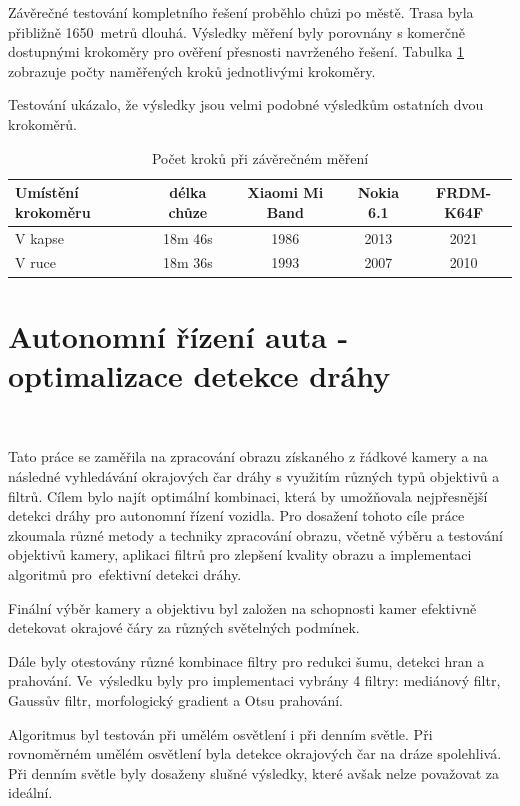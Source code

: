 Závěrečné testování kompletního řešení proběhlo chůzi po městě. Trasa byla přibližně 1650~metrů dlouhá. Výsledky měření byly porovnány s komerčně dostupnými krokoměry pro ověření přesnosti navrženého řešení. Tabulka \ref{tab:2}  zobrazuje počty naměřených kroků jednotlivými krokoměry.

Testování ukázalo, že výsledky jsou velmi podobné výsledkům ostatních dvou krokoměrů\cite{krokomer}.

\begin{table}[!htbp]
	\centering
	\begin{tabular}{lcccc}
		\toprule
		Umístění krokoměru & délka chůze & Xiaomi Mi Band & Nokia 6.1 & FRDM-K64F \\
		\midrule
		V kapse            & 18m 46s     & 1986           & 2013      & 2021      \\
		V ruce             & 18m 36s     & 1993           & 2007      & 2010      \\
		\bottomrule
	\end{tabular}
	\caption{Počet kroků při závěrečném měření%
	}
	\label{tab:2}
\end{table}

\section{Autonomní řízení auta - optimalizace detekce dráhy}\

Tato práce se zaměřila na zpracování obrazu získaného z řádkové kamery a na následné vyhledávání okrajových čar dráhy s využitím různých typů objektivů a filtrů. Cílem bylo najít optimální kombinaci, která by umožňovala nejpřesnější detekci dráhy pro autonomní řízení vozidla. Pro dosažení tohoto cíle práce zkoumala různé metody a techniky zpracování obrazu, včetně výběru a testování objektivů kamery, aplikaci filtrů pro zlepšení kvality obrazu a implementaci algoritmů pro~efektivní detekci dráhy.

Finální výběr kamery a objektivu byl založen na schopnosti kamer efektivně detekovat okrajové čáry za různých světelných podmínek.

Dále byly otestovány různé kombinace filtry pro redukci šumu, detekci hran a prahování. Ve~výsledku byly pro implementaci vybrány 4 filtry: mediánový filtr, Gaussův filtr, morfologický gradient a Otsu prahování.

Algoritmus byl testován při umělém osvětlení i při denním světle. Při rovnoměrném umělém osvětlení byla detekce okrajových čar na dráze spolehlivá. Při denním světle byly dosaženy slušné výsledky, které avšak nelze považovat za ideální\cite{draha}.


